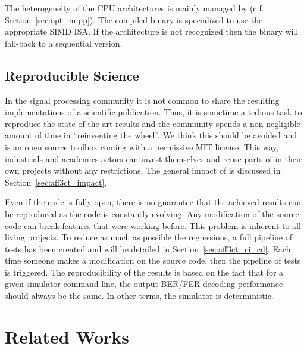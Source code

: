 The heterogeneity of the CPU architectures is mainly managed by \MIPP (c.f.
Section~\ref{sec:opt_mipp}). The compiled binary is specialized to use the
appropriate SIMD ISA. If the architecture is not recognized then the \AFFECT
binary will fall-back to a sequential version.

\subsection{Reproducible Science}

In the signal processing community it is not common to share the resulting
implementations of a scientific publication. Thus, it is sometime a tedious task
to reproduce the state-of-the-art results and the community spends a
non-negligible amount of time in ``reinventing the wheel''. We think this should
be avoided and \AFFECT is an open source toolbox coming with a permissive MIT
license. This way, industrials and academics actors can invest themselves and
reuse parts of \AFFECT in their own projects without any restrictions. The
general impact of \AFFECT is discussed in Section~\ref{sec:aff3ct_impact}.

Even if the code is fully open, there is no guarantee that the achieved results
can be reproduced as the code is constantly evolving. Any modification of the
source code can break features that were working before. This problem is
inherent to all living projects. To reduce as much as possible the regressions,
a full pipeline of tests has been created and will be detailed in
Section~\ref{sec:aff3ct_ci_cd}. Each time someone makes a modification on the
\AFFECT source code, then the pipeline of tests is triggered. The
reproducibility of the results is based on the fact that for a given \AFFECT
simulator command line, the output BER/FER decoding performance should always be
the same. In other terms, the \AFFECT simulator is deterministic.

\section{Related Works}
\label{sec:aff3ct_related_works}

